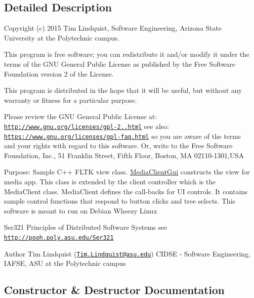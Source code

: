 \subsection{Detailed Description}
Copyright (c) 2015 Tim Lindquist, Software Engineering, Arizona State University at the Polytechnic campus. 

This program is free software; you can redistribute it and/or modify it under the terms of the G\+N\+U General Public License as published by the Free Software Foundation version 2 of the License. 

This program is distributed in the hope that it will be useful, but without any warranty or fitness for a particular purpose. 

Please review the G\+N\+U General Public License at\+: \href{http://www.gnu.org/licenses/gpl-2.0.html}{\tt http\+://www.\+gnu.\+org/licenses/gpl-\/2..\+html} see also\+: \href{https://www.gnu.org/licenses/gpl-faq.html}{\tt https\+://www.\+gnu.\+org/licenses/gpl-\/faq.\+html} so you are aware of the terms and your rights with regard to this software. Or, write to the Free Software Foundation, Inc., 51 Franklin Street, Fifth Floor, Boston, M\+A 02110-\/1301,U\+S\+A 

Purpose\+: Sample C++ F\+L\+T\+K view class. \hyperlink{class_media_client_gui}{Media\+Client\+Gui} constructs the view for media app. This class is extended by the client controller which is the Media\+Client class. Media\+Client defines the call-\/backs for U\+I controls. It contains sample control functions that respond to button clicks and tree selects. This software is meant to run on Debian Wheezy Linux 

Ser321 Principles of Distributed Software Systems see \href{http://pooh.poly.asu.edu/Ser321}{\tt http\+://pooh.\+poly.\+asu.\+edu/\+Ser321} \begin{DoxyAuthor}{Author}
Tim Lindquist (\href{mailto:Tim.Lindquist@asu.edu}{\tt Tim.\+Lindquist@asu.\+edu}) C\+I\+D\+S\+E -\/ Software Engineering, I\+A\+F\+S\+E, A\+S\+U at the Polytechnic campus 
\end{DoxyAuthor}


\subsection{Constructor \& Destructor Documentation}
\hypertarget{class_media_client_gui_a73eeabbba329bd1b7f558d65e0c3eab3}{}
